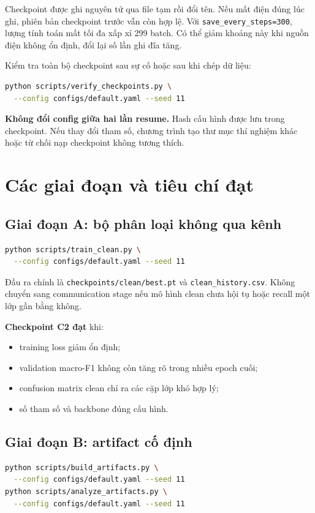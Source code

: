 \documentclass[11pt,journal,onecolumn]{IEEEtran}
\begin{document}
Checkpoint được ghi nguyên tử qua file tạm rồi đổi tên. Nếu mất điện đúng lúc ghi, phiên bản checkpoint trước vẫn còn hợp lệ. Với \texttt{save\_every\_steps=300}, lượng tính toán mất tối đa xấp xỉ 299 batch. Có thể giảm khoảng này khi nguồn điện không ổn định, đổi lại số lần ghi đĩa tăng.

Kiểm tra toàn bộ checkpoint sau sự cố hoặc sau khi chép dữ liệu:
\begin{lstlisting}[language=bash]
python scripts/verify_checkpoints.py \
  --config configs/default.yaml --seed 11
\end{lstlisting}

\textbf{Không đổi config giữa hai lần resume.} Hash cấu hình được lưu trong checkpoint. Nếu thay đổi tham số, chương trình tạo thư mục thí nghiệm khác hoặc từ chối nạp checkpoint không tương thích.

\section{Các giai đoạn và tiêu chí đạt}
\subsection{Giai đoạn A: bộ phân loại không qua kênh}
\begin{lstlisting}[language=bash]
python scripts/train_clean.py \
  --config configs/default.yaml --seed 11
\end{lstlisting}

Đầu ra chính là \texttt{checkpoints/clean/best.pt} và \texttt{clean\_history.csv}. Không chuyển sang communication stage nếu mô hình clean chưa hội tụ hoặc recall một lớp gần bằng không.

\textbf{Checkpoint C2 đạt} khi:
\begin{itemize}
\item training loss giảm ổn định;
\item validation macro-F1 không còn tăng rõ trong nhiều epoch cuối;
\item confusion matrix clean chỉ ra các cặp lớp khó hợp lý;
\item số tham số và backbone đúng cấu hình.
\end{itemize}

\subsection{Giai đoạn B: artifact cố định}
\begin{lstlisting}[language=bash]
python scripts/build_artifacts.py \
  --config configs/default.yaml --seed 11
python scripts/analyze_artifacts.py \
  --config configs/default.yaml --seed 11
\end{lstlisting}
\end{document}
